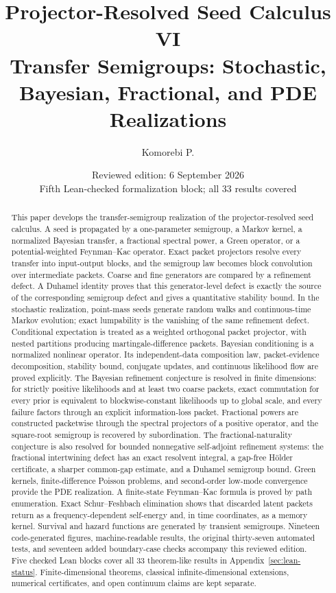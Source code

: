 \documentclass[11pt]{article}
\title{\textbf{Projector-Resolved Seed Calculus VI}\\[0.45em]
\large Transfer Semigroups: Stochastic, Bayesian, Fractional, and PDE Realizations}
\author{Komorebi P.}
\date{Reviewed edition: 6 September 2026\\\small Fifth Lean-checked formalization block; all 33 results covered}
\theoremstyle{definition}
\theoremstyle{remark}
\begin{document}
\maketitle

\begin{abstract}
This paper develops the transfer-semigroup realization of the projector-resolved seed calculus. A seed is propagated by a one-parameter semigroup, a Markov kernel, a normalized Bayesian transfer, a fractional spectral power, a Green operator, or a potential-weighted Feynman--Kac operator. Exact packet projectors resolve every transfer into input-output blocks, and the semigroup law becomes block convolution over intermediate packets. Coarse and fine generators are compared by a refinement defect. A Duhamel identity proves that this generator-level defect is exactly the source of the corresponding semigroup defect and gives a quantitative stability bound. In the stochastic realization, point-mass seeds generate random walks and continuous-time Markov evolution; exact lumpability is the vanishing of the same refinement defect. Conditional expectation is treated as a weighted orthogonal packet projector, with nested partitions producing martingale-difference packets. Bayesian conditioning is a normalized nonlinear operator. Its independent-data composition law, packet-evidence decomposition, stability bound, conjugate updates, and continuous likelihood flow are proved explicitly.  The Bayesian refinement conjecture is resolved in finite dimensions: for strictly positive likelihoods and at least two coarse packets, exact commutation for every prior is equivalent to blockwise-constant likelihoods up to global scale, and every failure factors through an explicit information-loss packet. Fractional powers are constructed packetwise through the spectral projectors of a positive operator, and the square-root semigroup is recovered by subordination. The fractional-naturality conjecture is also resolved for bounded nonnegative self-adjoint refinement systems: the fractional intertwining defect has an exact resolvent integral, a gap-free Hölder certificate, a sharper common-gap estimate, and a Duhamel semigroup bound. Green kernels, finite-difference Poisson problems, and second-order low-mode convergence provide the PDE realization. A finite-state Feynman--Kac formula is proved by path enumeration. Exact Schur--Feshbach elimination shows that discarded latent packets return as a frequency-dependent self-energy and, in time coordinates, as a memory kernel. Survival and hazard functions are generated by transient semigroups. Nineteen code-generated figures, machine-readable results, the original thirty-seven automated tests, and seventeen added boundary-case checks accompany this reviewed edition. Five checked Lean blocks cover all 33 theorem-like results in Appendix~\ref{sec:lean-status}. Finite-dimensional theorems, classical infinite-dimensional extensions, numerical certificates, and open continuum claims are kept separate.
\end{abstract}
\end{document}
